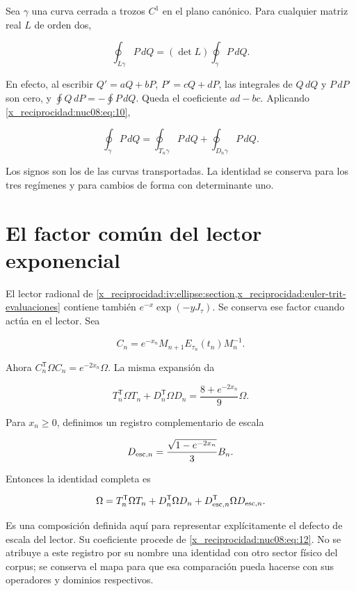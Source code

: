 Sea \(\gamma\) una curva cerrada a trozos \(C^1\) en el plano canónico. Para cualquier matriz real \(L\) de orden dos,

\[
\oint_{L\gamma}P\,dQ=(\det L)\oint_\gamma P\,dQ.
\]

En efecto, al escribir \(Q'=aQ+bP\), \(P'=cQ+dP\), las integrales de \(Q\,dQ\) y \(P\,dP\) son cero, y \(\oint Q\,dP=-\oint P\,dQ\). Queda el coeficiente \(ad-bc\). Aplicando \eqref{x_reciprocidad:nuc08:eq:10},

\begin{equation}
\boxed{\oint_\gamma P\,dQ
=\oint_{T_n\gamma}P\,dQ+\oint_{D_n\gamma}P\,dQ.}
\label{x_reciprocidad:nuc08:eq:11}
\end{equation}

Los signos son los de las curvas transportadas. La identidad se conserva para los tres regímenes y para cambios de forma con determinante uno.

\section{El factor común del lector exponencial}

El lector radional de \cref{x_reciprocidad:iv:ellipse:section,x_reciprocidad:euler-trit-evaluaciones} contiene también \(e^{-x}\exp(-yJ_\tau)\). Se conserva ese factor cuando actúa en el lector. Sea

\[
C_n=e^{-x_n}M_{n+1}E_{\tau_n}(t_n)M_n^{-1}.
\]

Ahora \(C_n^\mathsf T\Omega C_n=e^{-2x_n}\Omega\). La misma expansión da

\begin{equation}
T_n^\mathsf T\Omega T_n+D_n^\mathsf T\Omega D_n
=\frac{8+e^{-2x_n}}9\Omega.
\label{x_reciprocidad:nuc08:eq:12}
\end{equation}

Para \(x_n\geq0\), definimos un registro complementario de escala

\[
D_{{\rm esc},n}=\frac{\sqrt{1-e^{-2x_n}}}{3}B_n.
\]

Entonces la identidad completa es

\begin{equation}
\Omega=T_n^\mathsf T\Omega T_n+D_n^\mathsf T\Omega D_n
+D_{{\rm esc},n}^\mathsf T\Omega D_{{\rm esc},n}.
\label{x_reciprocidad:nuc08:eq:13}
\end{equation}

Es una composición definida aquí para representar explícitamente el defecto de escala del lector. Su coeficiente procede de \eqref{x_reciprocidad:nuc08:eq:12}. No se atribuye a este registro por su nombre una identidad con otro sector físico del corpus; se conserva el mapa para que esa comparación pueda hacerse con sus operadores y dominios respectivos.

